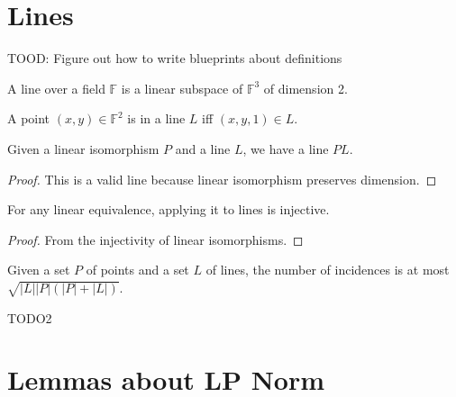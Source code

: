 \chapter{Lines}
\label{chap:line}

TOOD: Figure out how to write blueprints about definitions

\begin{definition}
    \label{Line}
    \leanok
    A line over a field $\mathbb{F}$ is a linear subspace of $\mathbb{F}^3$ of dimension 2.
\end{definition}

\begin{definition}
    \label{Line_mem}
    \leanok
    A point $(x, y) \in \mathbb{F}^2$ is in a line $L$ iff $(x, y, 1) \in L$.
\end{definition}

\begin{definition}
    \label{line_apply}
    \leanok
    Given a linear isomorphism $P$ and a line $L$, we have a line $PL$.
\end{definition}

\begin{proof}
    \leanok
    This is a valid line because linear isomorphism preserves dimension.
\end{proof}

\begin{lemma}
    \label{apply_injective}
    \leanok
    For any linear equivalence, applying it to lines is injective.
\end{lemma}

\begin{proof}
    \leanok
    From the injectivity of linear isomorphisms.
\end{proof}

\begin{theorem}
    \label{CS_UB}
    \leanok
    Given a set $P$ of points and a set $L$ of lines, the number of incidences is at most
    $\sqrt{|L| |P| (|P| + |L|)}$.
\end{theorem}

TODO2

\chapter{Lemmas about LP Norm}
\label{chap:lplemmas}


